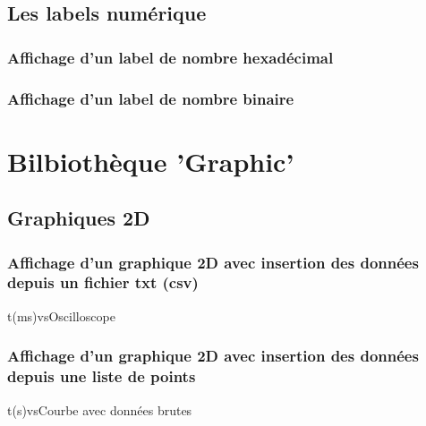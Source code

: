 \section{Les labels numérique}

\subsection{Affichage d'un label de nombre hexadécimal}

\subsection{Affichage d'un label de nombre binaire}



\chapter{Bilbiothèque 'Graphic'}

\section{Graphiques 2D}
\subsection{Affichage d'un graphique 2D avec insertion des données depuis un fichier txt (csv)}


\begin{graphics}{0.8}{0.6}{0}{2.1}{-1.1}{1.1}{t(ms)}{vs}{Oscilloscope}
\end{graphics}

\subsection{Affichage d'un graphique 2D avec insertion des données depuis une liste de points}


\begin{graphics}{0.8}{0.4}{0}{40}{-1}{6}{t(s)}{vs}{Courbe avec données brutes}
\end{graphics}


